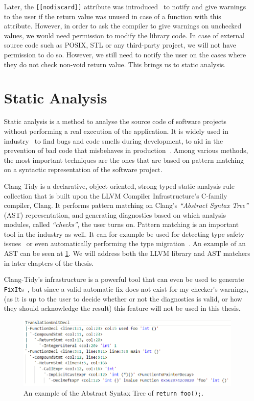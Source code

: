 Later, the \texttt{[[nodiscard]]} attribute was introduced~\cite{cppreferencenodiscard} to notify and give warnings to
the user if the return value was unused in case of a function
with this attribute. However, in order to ask the compiler to give warnings on unchecked values, we would need permission to modify the library code.
In case of external source code such as POSIX, STL or any third-party project, we will not have permission to do so.
However, we still need to notify the user on the cases where they do not check non-void return value. This brings us to static analysis.

\section{Static Analysis}

Static analysis is a method to analyse the source code of software projects without performing a real execution of the application.
It is widely used in industry~\cite{statcompare}
to find bugs and code smells during development, to aid in the prevention of bad code that misbehaves in
production~\cite{googlearticle}.
Among various methods, the most important techniques are the ones that are based on pattern matching on a syntactic representation of
the software project.

Clang-Tidy is a declarative, object oriented, strong typed static analysis rule collection that is built upon the LLVM Compiler
Infrastructure's C-family compiler, Clang.
It performs pattern matching on Clang's \emph{``Abstract Syntax Tree''} (AST) representation, and generating diagnostics based on which
analysis modules, called \emph{``checks''}, the user turns on. Pattern matching is an important tool in the industry as well. It can for
example be used for detecting type safety issues~\cite{SZALAY2021111048} or even automatically performing the type migration~\cite{typemig}. An example of an AST can be seen at \cref{fig:ast1}.
We will address both the LLVM library and AST matchers in later chapters of the thesis.

Clang-Tidy's infrastructure is a powerful tool that can even be used to generate \texttt{FixIt}s~\cite{autorefact}, but since a
valid automatic fix does not exist for my checker's warnings, (as it is up to the user to decide whether or not the diagnostics is
valid, or how they should acknowledge the result) this feature will not be used in this thesis.


\begin{figure}[H]
    \includegraphics[width=\linewidth]{images/return_foo_ast.png}
    \caption{An example of the Abstract Syntax Tree of \texttt{return foo();}.}
    \label{fig:ast1}
\end{figure}


